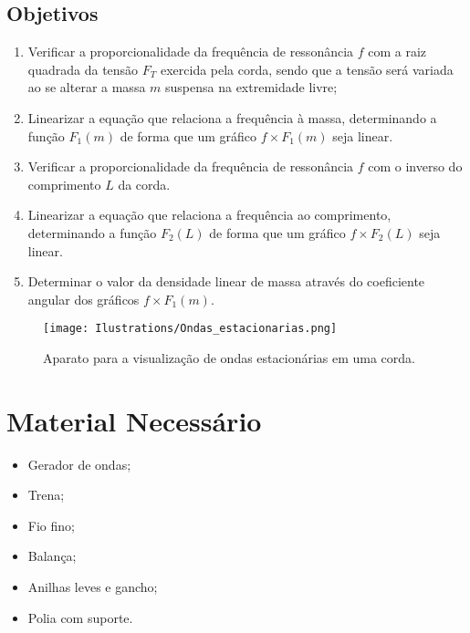 \subsection{Objetivos}
\label{Sec:ObjetivosOndasEstacionarias}

\begin{enumerate}
	\item Verificar a proporcionalidade da frequência de ressonância $f$ com a raiz quadrada da tensão $F_T$ exercida pela corda, sendo que a tensão será variada ao se alterar a massa $m$ suspensa na extremidade livre;
	\item Linearizar a equação que relaciona a frequência à massa, determinando a função $F_1(m)$ de forma que um gráfico $f \times F_1(m)$ seja linear.
	\item Verificar a proporcionalidade da frequência de ressonância $f$ com o inverso do comprimento $L$ da corda.
	\item Linearizar a equação que relaciona a frequência ao comprimento, determinando a função $F_2(L)$ de forma que um gráfico $f \times F_2(L)$ seja linear.
	\item Determinar o valor da densidade linear de massa através do coeficiente angular dos gráficos $f \times F_1(m)$.
\end{enumerate}

\begin{figure}\forcerectofloat
	\centering
	\texttt{[image: Ilustrations/Ondas\_estacionarias.png]}
	\caption{Aparato para a visualização de ondas estacionárias em uma corda.}
\end{figure}

\section{Material Necessário}

\begin{itemize}
	\item Gerador de ondas;
	\item Trena;
	\item Fio fino;
	\item Balança;
	\item Anilhas leves e gancho;
	\item Polia com suporte.
\end{itemize}

